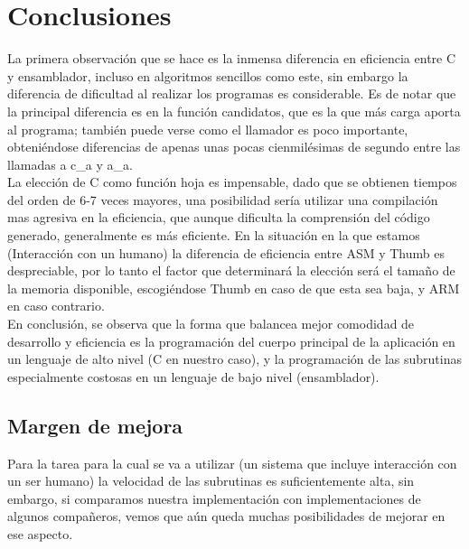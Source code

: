 \documentclass[12pt,letterpaper]{article}
\begin{document}
\section{Conclusiones}

La primera observaci\'on que se hace es la inmensa diferencia en
eficiencia entre C y ensamblador, incluso en algoritmos sencillos como
este, sin embargo la diferencia de dificultad al realizar los
programas es considerable. Es de notar que la principal diferencia es
en la funci\'on candidatos, que es la que m\'as carga aporta al programa;
tambi\'en puede verse como el llamador es poco importante, obteni\'endose
diferencias de apenas unas pocas cienmil\'esimas de segundo entre las
llamadas a c\_a y a\_a.\\
La elecci\'on de C como funci\'on hoja es impensable, dado que se obtienen
tiempos del orden de 6-7 veces mayores, una posibilidad ser\'ia utilizar
una compilaci\'on mas agresiva en la eficiencia, que aunque dificulta la
comprensi\'on del c\'odigo generado, generalmente es m\'as eficiente. En la
situaci\'on en la que estamos (Interacci\'on con un humano) la diferencia
de eficiencia entre ASM y Thumb es despreciable, por lo tanto el
factor que determinar\'a la elecci\'on ser\'a el tamaño de la memoria
disponible, escogi\'endose Thumb en caso de que esta sea baja, y ARM en
caso contrario.\\
En conclusi\'on, se observa que la forma que balancea mejor comodidad de
desarrollo y eficiencia es la programaci\'on del cuerpo principal de la
aplicaci\'on en un lenguaje de alto nivel (C en nuestro caso), y la
programaci\'on de las subrutinas especialmente costosas en un lenguaje
de bajo nivel (ensamblador).

\subsection{Margen de mejora}
Para la tarea para la cual se va a utilizar (un sistema que incluye
interacci\'on con un ser humano) la velocidad de las subrutinas es
suficientemente alta, sin embargo, si comparamos nuestra
implementaci\'on con implementaciones de algunos compañeros, vemos que
a\'un queda muchas posibilidades de mejorar en ese aspecto.
\clearpage
\end{document}
